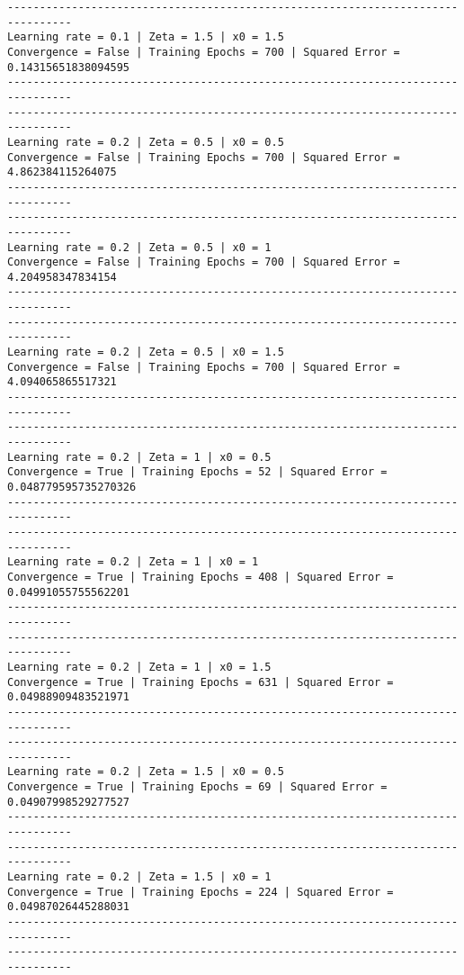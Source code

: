 \documentclass[11pt]{article}
\begin{document}
\begin{Verbatim}[commandchars=\\\{\}]
--------------------------------------------------------------------------------
Learning rate = 0.1 | Zeta = 1.5 | x0 = 1.5
Convergence = False | Training Epochs = 700 | Squared Error =
0.14315651838094595
--------------------------------------------------------------------------------
--------------------------------------------------------------------------------
Learning rate = 0.2 | Zeta = 0.5 | x0 = 0.5
Convergence = False | Training Epochs = 700 | Squared Error = 4.862384115264075
--------------------------------------------------------------------------------
--------------------------------------------------------------------------------
Learning rate = 0.2 | Zeta = 0.5 | x0 = 1
Convergence = False | Training Epochs = 700 | Squared Error = 4.204958347834154
--------------------------------------------------------------------------------
--------------------------------------------------------------------------------
Learning rate = 0.2 | Zeta = 0.5 | x0 = 1.5
Convergence = False | Training Epochs = 700 | Squared Error = 4.094065865517321
--------------------------------------------------------------------------------
--------------------------------------------------------------------------------
Learning rate = 0.2 | Zeta = 1 | x0 = 0.5
Convergence = True | Training Epochs = 52 | Squared Error = 0.048779595735270326
--------------------------------------------------------------------------------
--------------------------------------------------------------------------------
Learning rate = 0.2 | Zeta = 1 | x0 = 1
Convergence = True | Training Epochs = 408 | Squared Error = 0.04991055755562201
--------------------------------------------------------------------------------
--------------------------------------------------------------------------------
Learning rate = 0.2 | Zeta = 1 | x0 = 1.5
Convergence = True | Training Epochs = 631 | Squared Error = 0.04988909483521971
--------------------------------------------------------------------------------
--------------------------------------------------------------------------------
Learning rate = 0.2 | Zeta = 1.5 | x0 = 0.5
Convergence = True | Training Epochs = 69 | Squared Error = 0.04907998529277527
--------------------------------------------------------------------------------
--------------------------------------------------------------------------------
Learning rate = 0.2 | Zeta = 1.5 | x0 = 1
Convergence = True | Training Epochs = 224 | Squared Error = 0.04987026445288031
--------------------------------------------------------------------------------
--------------------------------------------------------------------------------

\end{Verbatim}
\end{document}
